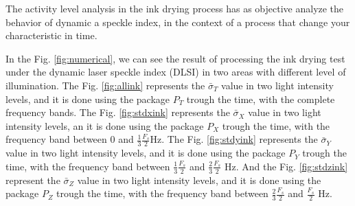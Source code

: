 \documentclass[review]{elsarticle}
\begin{document}
The activity level analysis in the  ink drying process has as objective  analyze the behavior of dynamic a speckle index, 
in the context of a process that change your characteristic in time. 

In the Fig. \ref{fig:numerical}, we can see the result of processing 
 the ink drying test under the dynamic laser speckle index (DLSI) in two areas with different level of illumination. The Fig. \ref{fig:allink}
represents the $\bar{\sigma}_T$ value in two light intensity levels, and it is done using the package $P_T$
trough the time, with the complete frequency bands.
The Fig. \ref{fig:stdxink}
represents the $\bar{\sigma}_X$ value in two light intensity levels, an it is done using the package $P_X$
trough the time, with the frequency band between $0$ and $\frac{1}{3}\frac{F_s}{2}$Hz.
The Fig. \ref{fig:stdyink}
represents the $\bar{\sigma}_Y$ value in two light intensity levels, and it is done using the package $P_Y$
trough the time, with the frequency band between $\frac{1}{3}\frac{F_s}{2}$ and $\frac{2}{3}\frac{F_s}{2}$ Hz.
And the Fig. \ref{fig:stdzink}
represent the $\bar{\sigma}_Z$ value in two light intensity levels, and it is done using the package $P_Z$
trough the time, with the frequency band between $\frac{2}{3}\frac{F_s}{2}$ and $\frac{F_s}{2}$ Hz.
\end{document}
